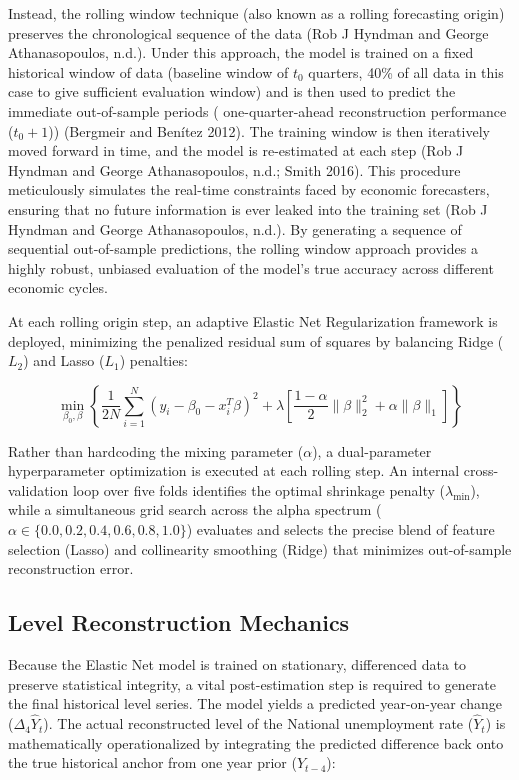 \documentclass[
  letterpaper,
  DIV=11,
  numbers=noendperiod]{scrartcl}
\begin{document}
Instead, the rolling window technique (also known as a rolling
forecasting origin) preserves the chronological sequence of the data
(Rob J Hyndman and George Athanasopoulos, n.d.). Under this approach,
the model is trained on a fixed historical window of data (baseline
window of \(t_0\) quarters, 40\% of all data in this case to give
sufficient evaluation window) and is then used to predict the immediate
out-of-sample periods ( one-quarter-ahead reconstruction performance
(\(t_0 + 1\))) (Bergmeir and Benítez 2012). The training window is then
iteratively moved forward in time, and the model is re-estimated at each
step (Rob J Hyndman and George Athanasopoulos, n.d.; Smith 2016). This
procedure meticulously simulates the real-time constraints faced by
economic forecasters, ensuring that no future information is ever leaked
into the training set (Rob J Hyndman and George Athanasopoulos, n.d.).
By generating a sequence of sequential out-of-sample predictions, the
rolling window approach provides a highly robust, unbiased evaluation of
the model's true accuracy across different economic cycles.

At each rolling origin step, an adaptive Elastic Net Regularization
framework is deployed, minimizing the penalized residual sum of squares
by balancing Ridge (\(L_2\)) and Lasso (\(L_1\)) penalties:

\[\min_{\beta_0, \beta} \left\{ \frac{1}{2N} \sum_{i=1}^N \left( y_i - \beta_0 - x_i^T \beta \right)^2 + \lambda \left[ \frac{1-\alpha}{2} \|\beta\|_2^2 + \alpha \|\beta\|_1 \right] \right\}\]

Rather than hardcoding the mixing parameter (\(\alpha\)), a
dual-parameter hyperparameter optimization is executed at each rolling
step. An internal cross-validation loop over five folds identifies the
optimal shrinkage penalty (\(\lambda_{\min}\)), while a simultaneous
grid search across the alpha spectrum
(\(\alpha \in \{0.0, 0.2, 0.4, 0.6, 0.8, 1.0\}\)) evaluates and selects
the precise blend of feature selection (Lasso) and collinearity
smoothing (Ridge) that minimizes out-of-sample reconstruction error.

\subsection{Level Reconstruction
Mechanics}\label{level-reconstruction-mechanics}

Because the Elastic Net model is trained on stationary, differenced data
to preserve statistical integrity, a vital post-estimation step is
required to generate the final historical level series. The model yields
a predicted year-on-year change (\(\Delta_4 \hat{Y}_t\)). The actual
reconstructed level of the National unemployment rate (\(\hat{Y}_t\)) is
mathematically operationalized by integrating the predicted difference
back onto the true historical anchor from one year prior (\(Y_{t-4}\)):
\end{document}
